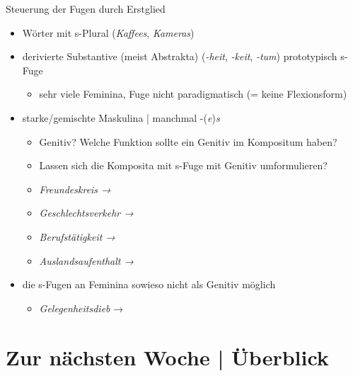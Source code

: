 \begin{frame}
  {Steuerung der Fugen durch Erstglied}
  \onslide<+->
  \begin{itemize}[<+->]
    \item Wörter mit s-Plural (\textit{Kaffees}, \textit{Kameras}) 
      \Halbzeile
    \item \alert{derivierte} Substantive (meist Abstrakta) (\textit{-heit}, \textit{-keit}, \textit{-tum}) \alert{prototypisch s-Fuge}
      \begin{itemize}[<+->]
        \item sehr viele Feminina, Fuge nicht paradigmatisch (= keine Flexionsform)
      \end{itemize}
      \Halbzeile
    \item starke\slash gemischte Maskulina | manchmal -(\textit{e})\textit{s}
      \begin{itemize}[<+->]
        \item Genitiv? Welche Funktion sollte ein Genitiv im Kompositum haben?
        \item Lassen sich die Komposita mit s-Fuge mit Genitiv umformulieren?
        \item \textit{Freundeskreis → }
        \item \textit{Geschlechtsverkehr → }
        \item \textit{Berufstätigkeit → }
        \item \textit{Auslandsaufenthalt → }
      \end{itemize}
    \Halbzeile
  \item die s-Fugen an \alert{Feminina} sowieso nicht als Genitiv möglich
      \begin{itemize}
        \item \textit{Gelegenheitsdieb} → 
      \end{itemize}
  \end{itemize}
\end{frame}

\section{Zur nächsten Woche | Überblick}

